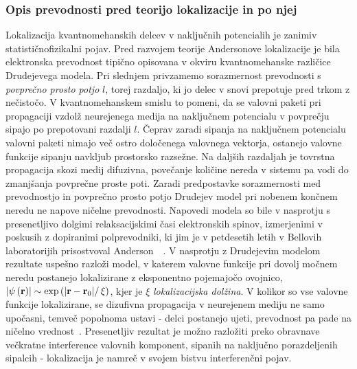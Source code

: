 \documentclass[10pt,a4paper]{article}
\begin{document}
 \subsubsection{Opis prevodnosti pred teorijo lokalizacije in po njej}  
 Lokalizacija kvantnomehanskih delcev v naključnih potencialih je zanimiv statističnofizikalni pojav. Pred razvojem teorije Andersonove lokalizacije je bila elektronska prevodnost tipično opisovana v okviru kvantnomehanske različice Drudejevega modela. Pri slednjem privzamemo sorazmernost prevodnosti s \emph{povprečno prosto potjo} $l$, torej razdaljo, ki jo delec v snovi prepotuje pred trkom z nečistočo. V kvantnomehanskem smislu to pomeni, da se valovni paketi pri propagaciji vzdolž neurejenega medija na naključnem potencialu v povprečju sipajo po prepotovani razdalji $l$. Čeprav zaradi sipanja na naključnem potencialu valovni paketi nimajo več ostro določenega valovnega vektorja, ostanejo valovne funkcije sipanju navkljub prostorsko razsežne. Na daljših razdaljah je tovrstna propagacija skozi medij difuzivna, povečanje količine nereda v sistemu pa vodi do zmanjšanja povprečne proste poti. Zaradi predpostavke sorazmernosti med prevodnostjo in povprečno prosto potjo Drudejev model pri nobenem končnem neredu ne napove ničelne prevodnosti. Napovedi modela so bile v nasprotju s presenetljivo dolgimi relaksacijskimi časi elektronskih spinov, izmerjenimi v poskusih z dopiranimi polprevodniki, ki jim je v petdesetih letih v Bellovih laboratorijih prisostvoval Anderson~\cite{lagendijk2009fifty}~\cite{anderson1978local}. V nasprotju z Drudejevim modelom rezultate uspešno razloži model, v katerem valovne funkcije pri dovolj močnem neredu postanejo lokalizirane z eksponentno pojemajočo ovojnico, $\left|\psi\left(\textbf{r}\right)\right|   \sim \exp\left(\left|\textbf{r}- \textbf{r}_0\right|\right/\xi)$, kjer je $\xi$ \emph{lokalizacijska dolžina}. V kolikor so vse valovne funkcije lokalizirane, se dizufivna propagacija v neurejenem mediju ne samo upočasni, temveč popolnoma ustavi - delci postanejo ujeti, prevodnost pa pade na ničelno vrednost~\cite{wolfle2010self}. Presenetljiv rezultat je možno razložiti preko obravnave večkratne interference valovnih komponent, sipanih na naključno porazdeljenih sipalcih - lokalizacija je namreč v svojem bistvu interferenčni pojav. 
\end{document}
